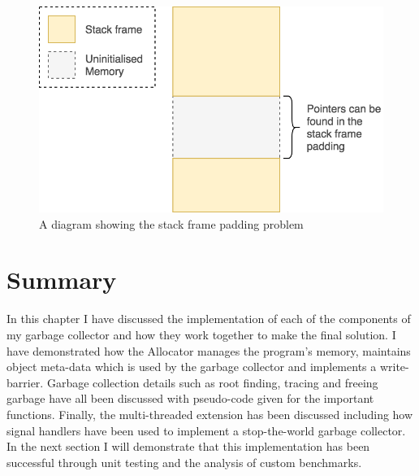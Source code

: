 \documentclass[../diss.tex]{subfiles}
\begin{document}
\begin{figure}
    \centering
    \includegraphics[max width=\linewidth]{figs/stackframepadding.png}
    \caption{A diagram showing the stack frame padding problem}
    \label{fig:stackframepadding}
\end{figure}

\section{Summary}

In this chapter I have discussed the implementation of each of the components of my garbage collector and how they work together to make the final solution. I have demonstrated how the Allocator manages the program's memory, maintains object meta-data which is used by the garbage collector and implements a write-barrier. Garbage collection details such as root finding, tracing and freeing garbage have all been discussed with pseudo-code given for the important functions. Finally, the multi-threaded extension has been discussed including how signal handlers have been used to implement a stop-the-world garbage collector. In the next section I will demonstrate that this implementation has been successful through unit testing and the analysis of custom benchmarks.
\end{document}
